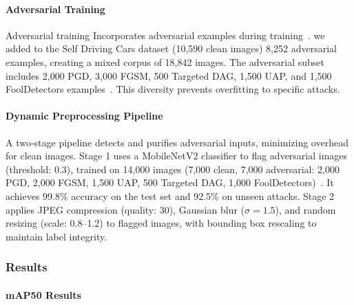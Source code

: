 \documentclass[conference]{IEEEtran}
\begin{document}
\paragraph{Adversarial Training}
Adversarial training Incorporates adversarial examples during training~\cite{madry2018towardspgd}. we added to the Self Driving Cars dataset (10,590 clean images) 8,252 adversarial examples, creating a mixed corpus of 18,842 images. The adversarial subset includes 2,000 PGD, 3,000 FGSM, 500 Targeted DAG, 1,500 UAP, and 1,500 FoolDetectors examples~\cite{goodfellow2015explaining,madry2018towardspgd,xie2017DAG,moosavi2017universal,lu2017fooldetectors}. This diversity prevents overfitting to specific attacks.





\paragraph{Dynamic Preprocessing Pipeline}
A two-stage pipeline detects and purifies adversarial inputs, minimizing overhead for clean images. Stage 1 uses a MobileNetV2 classifier to flag adversarial images (threshold: 0.3), trained on 14,000 images (7,000 clean, 7,000 adversarial: 2,000 PGD, 2,000 FGSM, 1,500 UAP, 500 Targeted DAG, 1,000 FoolDetectors)~\cite{goodfellow2015explaining,madry2018towardspgd,moosavi2017universal,xie2017DAG,lu2017fooldetectors}. It achieves 99.8\% accuracy on the test set and 92.5\% on unseen attacks. Stage 2 applies JPEG compression (quality: 30), Gaussian blur ($\sigma=1.5$), and random resizing (scale: 0.8–1.2) to flagged images, with bounding box rescaling to maintain label integrity.

\subsubsection{Results}
\paragraph{mAP50 Results}
\end{document}
